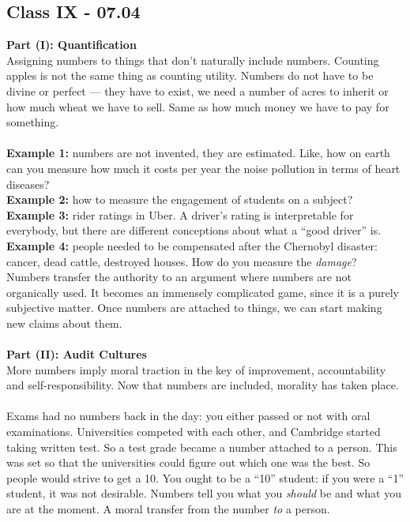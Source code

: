 \documentclass[a4paper,12pt]{article}
\begin{document}
\subsection*{Class IX - 07.04}
\noindent \textbf{Part (I): Quantification} \\
\noindent Assigning numbers to things that don't naturally include numbers. Counting apples is not the same thing as counting utility. Numbers do not have to be divine or perfect --- they have to exist, we need a number of acres to inherit or how much wheat we have to sell. Same as how much money we have to pay for something. \\
\\
\noindent \textbf{Example 1:} numbers are not invented, they are estimated. Like, how on earth can you measure how much it costs per year the noise pollution in terms of heart diseases? \\
\noindent \textbf{Example 2:} how to measure the engagement of students on a subject? \\
\noindent \textbf{Example 3:} rider ratings in Uber. A driver's rating is interpretable for everybody, but there are different conceptions about what a ``good driver'' is. \\
\noindent \textbf{Example 4:} people needed to be compensated after the Chernobyl disaster: cancer, dead cattle, destroyed houses. How do you measure the \emph{damage}?
\\
\noindent Numbers transfer the authority to an argument where numbers are not organically used. It becomes an immensely complicated game, since it is a purely subjective matter. Once numbers are attached to things, we can start making new claims about them. \\
\\
\noindent \textbf{Part (II): Audit Cultures} \\
\noindent More numbers imply moral traction in the key of improvement, accountability and self-responsibility. Now that numbers are included, morality has taken place. \\
\\
\noindent Exams had no numbers back in the day: you either passed or not with oral examinations. Universities competed with each other, and Cambridge started taking written test. So a test grade became a number attached to a person. This was set so that the universities could figure out which one was the best. So people would strive to get a 10. You ought to be a ``10'' student: if you were a ``1'' student, it was not desirable. Numbers tell you what you \emph{should} be and what you are at the moment. A moral transfer from the number \emph{to} a person.\\
\end{document}
